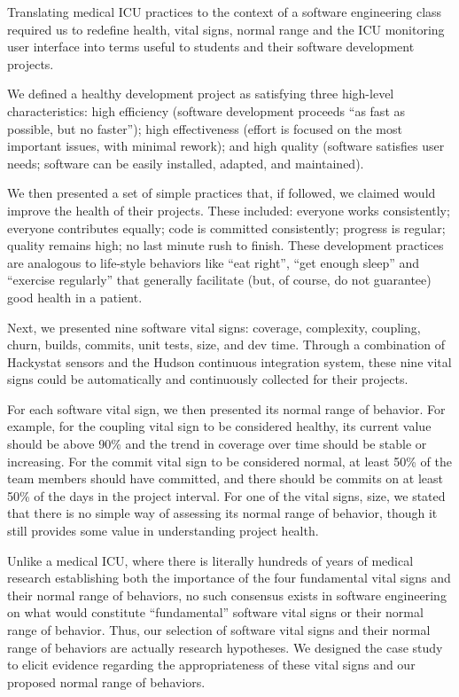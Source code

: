 \documentclass[10pt,twocolumn]{article}
\begin{document}
Translating medical ICU practices to the context of a software engineering
class required us to redefine health, vital signs, normal range
and the ICU monitoring user interface into terms useful to students and their
software development projects.

We defined a healthy development project as satisfying three high-level
characteristics: high efficiency (software development proceeds ``as fast
as possible, but no faster''); high effectiveness (effort is focused on the
most important issues, with minimal rework); and high quality (software
satisfies user needs; software can be easily installed, adapted, and
maintained).

We then presented a set of simple practices that, if followed, we claimed
would improve the health of their projects.  These
included: everyone works consistently; everyone contributes equally; code
is committed consistently; progress is regular; quality remains high; no
last minute rush to finish.  These development practices are analogous to
life-style behaviors like ``eat right'', ``get enough sleep'' and
``exercise regularly'' that generally facilitate (but, of course, do not
guarantee) good health in a patient.

Next, we presented nine software vital signs: coverage, complexity,
coupling, churn, builds, commits, unit tests, size, and dev
time. Through a combination of Hackystat sensors and the Hudson continuous
integration system, these nine vital signs could be automatically and
continuously collected for their projects.

For each software vital sign, we then presented its normal range of
behavior.  For example, for the coupling vital sign to be considered
healthy, its current value should be above 90\% and the trend in
coverage over time should be stable or increasing.  For the commit vital
sign to be considered normal, at least 50\% of the team members should have
committed, and there should be commits on at least 50\% of the days in the
project interval.  For one of the vital signs, size, we stated that
there is no simple way of assessing its normal range of behavior, though
it still provides some value in understanding project health.

Unlike a medical ICU, where there is literally hundreds of years of medical
research establishing both the importance of the four fundamental vital
signs and their normal range of behaviors, no such consensus exists in
software engineering on what would constitute ``fundamental'' software
vital signs or their normal range of behavior.  Thus, our selection of
software vital signs and their normal range of behaviors are actually
research hypotheses.  We designed the case study to elicit evidence
regarding the appropriateness of these vital signs and our proposed normal
range of behaviors.
\end{document}
